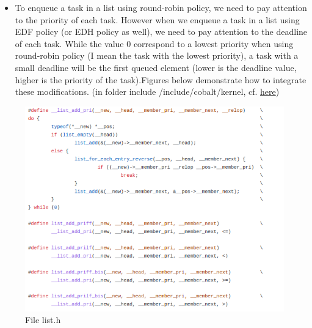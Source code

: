 \documentclass[12pt,hidelinks]{article}
\begin{document}
{\begin{itemize}
\begin{figure}[ht]
\begin{minipage}{0.45\textwidth}
            \caption{struct sched\_deadline\_param for EDF policy}
        \end{minipage}
    \end{figure} \newline
    
    \newpage
    \item To enqueue a task in a list using round-robin policy, we need to pay attention to the priority of each task. However when we enqueue a task in a list using EDF policy (or EDH policy as well), we need to pay attention to the deadline of each task. While the value 0 correspond to a lowest priority when using round-robin policy (I mean the task with the lowest priority), a task with a small deadline will be the first queued element (lower is the deadline value, higher is the priority of the task).\newline Figures below demonstrate how to integrate these modifications. (in folder include /include/cobalt/kernel, cf. \href{https://github.com/skyultime/Xenomai-EDH/tree/EDFpolicyV1.0/include/cobalt/kernel}{here})
    
    \end{itemize}
        	
    \begin{figure}[ht]
    \centering
	\includegraphics[scale=0.5]{list.png}
	\caption{File list.h}
	\end{figure} \newline
    
}
\end{document}

